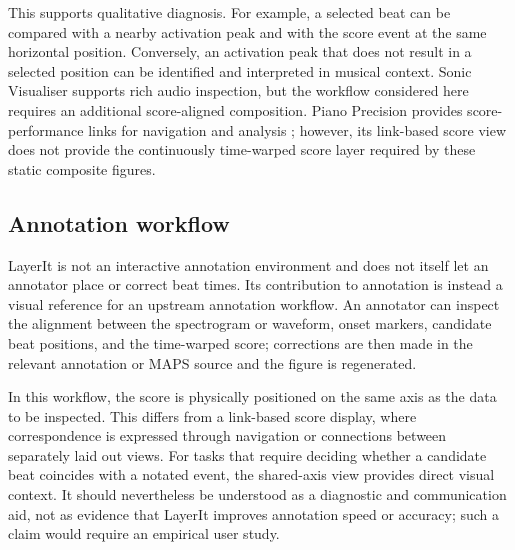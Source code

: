 This supports qualitative diagnosis. For example, a selected beat can be compared with a nearby activation peak and with the score event at the same horizontal position. Conversely, an activation peak that does not result in a selected position can be identified and interpreted in musical context. Sonic Visualiser supports rich audio inspection, but the workflow considered here requires an additional score-aligned composition. Piano Precision provides score-performance links for navigation and analysis \cite{jiangPIANOPRECISIONADVANCING2025}; however, its link-based score view does not provide the continuously time-warped score layer required by these static composite figures.

\subsection{Annotation workflow}

LayerIt is not an interactive annotation environment and does not itself let an annotator place or correct beat times. Its contribution to annotation is instead a visual reference for an upstream annotation workflow. An annotator can inspect the alignment between the spectrogram or waveform, onset markers, candidate beat positions, and the time-warped score; corrections are then made in the relevant annotation or MAPS source and the figure is regenerated.

In this workflow, the score is physically positioned on the same axis as the data to be inspected. This differs from a link-based score display, where correspondence is expressed through navigation or connections between separately laid out views. For tasks that require deciding whether a candidate beat coincides with a notated event, the shared-axis view provides direct visual context. It should nevertheless be understood as a diagnostic and communication aid, not as evidence that LayerIt improves annotation speed or accuracy; such a claim would require an empirical user study.

